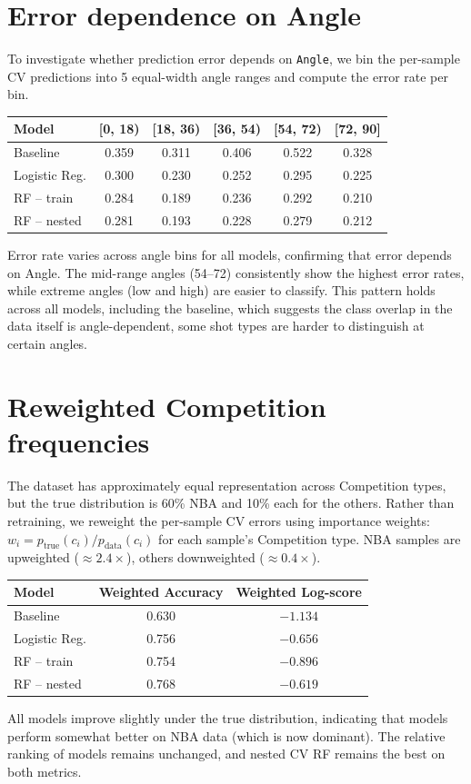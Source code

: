 \documentclass[10pt, a4paper]{article}
\begin{document}
\section{Error dependence on Angle}

To investigate whether prediction error depends on \texttt{Angle}, we bin the per-sample CV predictions into 5 equal-width angle ranges and compute the error rate per bin.

\begin{table}[h]
\centering
\begin{tabular}{lccccc}
\toprule
Model & [0, 18) & [18, 36) & [36, 54) & [54, 72) & [72, 90] \\
\midrule
Baseline      & 0.359 & 0.311 & 0.406 & 0.522 & 0.328 \\
Logistic Reg. & 0.300 & 0.230 & 0.252 & 0.295 & 0.225 \\
RF -- train   & 0.284 & 0.189 & 0.236 & 0.292 & 0.210 \\
RF -- nested  & 0.281 & 0.193 & 0.228 & 0.279 & 0.212 \\
\bottomrule
\end{tabular}
\end{table}

Error rate varies across angle bins for all models, confirming that error depends on Angle. The mid-range angles (54--72\textdegree) consistently show the highest error rates, while extreme angles (low and high) are easier to classify. This pattern holds across all models, including the baseline, which suggests the class overlap in the data itself is angle-dependent, some shot types are harder to distinguish at certain angles.

\section{Reweighted Competition frequencies}

The dataset has approximately equal representation across Competition types, but the true distribution is 60\% NBA and 10\% each for the others. Rather than retraining, we reweight the per-sample CV errors using importance weights: $w_i = p_{\text{true}}(c_i) / p_{\text{data}}(c_i)$ for each sample's Competition type. NBA samples are upweighted ($\approx 2.4\times$), others downweighted ($\approx 0.4\times$).

\begin{table}[h]
\centering
\begin{tabular}{lcc}
\toprule
Model & Weighted Accuracy & Weighted Log-score \\
\midrule
Baseline        & 0.630 & $-1.134$ \\
Logistic Reg.   & 0.756 & $-0.656$ \\
RF -- train     & 0.754 & $-0.896$ \\
RF -- nested    & 0.768 & $-0.619$ \\
\bottomrule
\end{tabular}
\end{table}

All models improve slightly under the true distribution, indicating that models perform somewhat better on NBA data (which is now dominant). The relative ranking of models remains unchanged, and nested CV RF remains the best on both metrics.
\end{document}
